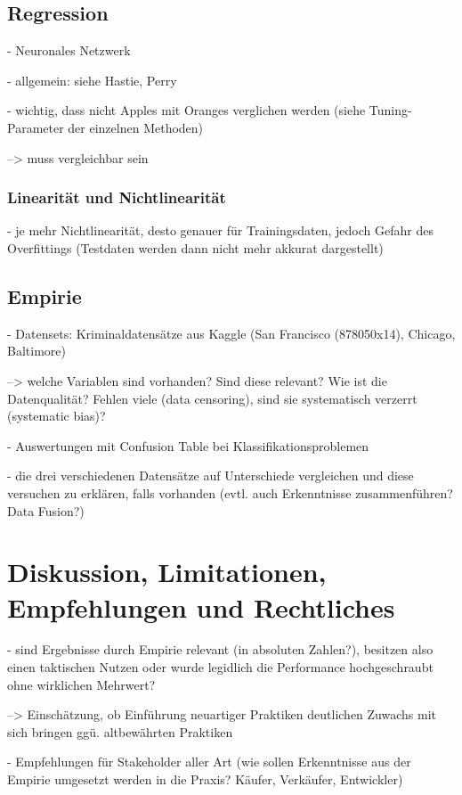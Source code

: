 \documentclass[a4paper,12pt,parskip,bibtotoc,liststotoc]{article}
\begin{document}
\subsection{Regression}

- Neuronales Netzwerk

- allgemein: siehe Hastie, Perry


- wichtig, dass nicht Apples mit Oranges verglichen werden (siehe Tuning-Parameter der einzelnen Methoden)

--> muss vergleichbar sein


\subsubsection{Linearität und Nichtlinearität}

- je mehr Nichtlinearität, desto genauer für Trainingsdaten, jedoch Gefahr des Overfittings (Testdaten werden dann nicht mehr akkurat dargestellt)


\newpage
\subsection{Empirie}

- Datensets: Kriminaldatensätze aus Kaggle (San Francisco (878050x14), Chicago, Baltimore)

--> welche Variablen sind vorhanden? Sind diese relevant? Wie ist die Datenqualität? Fehlen viele (data censoring), sind sie systematisch verzerrt (systematic bias)?

- Auswertungen mit Confusion Table bei Klassifikationsproblemen

- die drei verschiedenen Datensätze auf Unterschiede vergleichen und diese versuchen zu erklären, falls vorhanden (evtl. auch Erkenntnisse zusammenführen? Data Fusion?)


\newpage
\section{Diskussion, Limitationen, Empfehlungen und Rechtliches}

- sind Ergebnisse durch Empirie relevant (in absoluten Zahlen?), besitzen also einen taktischen Nutzen oder wurde legidlich die Performance hochgeschraubt ohne wirklichen Mehrwert?

--> Einschätzung, ob Einführung neuartiger Praktiken deutlichen Zuwachs mit sich bringen ggü. altbewährten Praktiken

- Empfehlungen für Stakeholder aller Art (wie sollen Erkenntnisse aus der Empirie umgesetzt werden in die Praxis? Käufer, Verkäufer, Entwickler)
\end{document}
